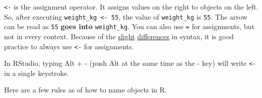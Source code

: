 \documentclass[]{book}
\begin{document}
\texttt{\textless{}-} is the assignment operator. It assigns values on
the right to objects on the left. So, after executing
\texttt{weight\_kg\ \textless{}-\ 55}, the value of \texttt{weight\_kg}
is \texttt{55}. The arrow can be read as \texttt{55} \textbf{goes into}
\texttt{weight\_kg}. You can also use \texttt{=} for assignments, but
not in every context. Because of the
\href{http://blog.revolutionanalytics.com/2008/12/use-equals-or-arrow-for-assignment.html}{slight}
\href{https://web.archive.org/web/20130610005305/https://stat.ethz.ch/pipermail/r-help/2009-March/191462.html}{differences}
in syntax, it is good practice to always use \texttt{\textless{}-} for
assignments.

In RStudio, typing Alt + - (push Alt at the same time as the - key) will
write \texttt{\textless{}-} in a single keystroke.

Here are a few rules as of how to name objects in R.
\end{document}
